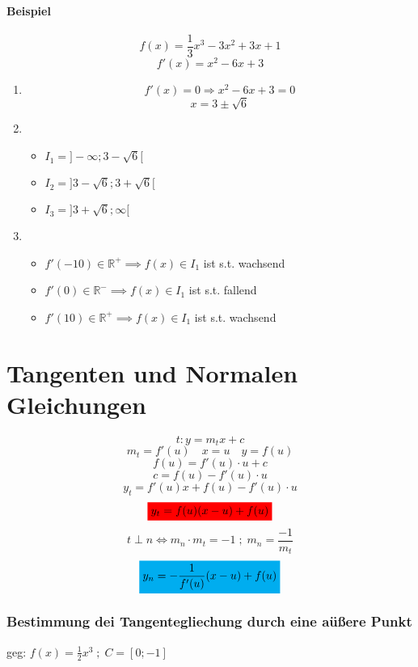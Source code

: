 \documentclass{scrbook}
\newcommand{\mathcolorbox}[2]{\colorbox{#1}{$\displaystyle #2$}}
\begin{document}
\subsubsection{Beispiel}
\[f(x) = \frac 13 x^3 - 3x^2 +3x+1\]
\[f'(x) = x^2 - 6x + 3\]
\begin{enumerate}
\item \[f'(x) = 0 \Rightarrow x^2 - 6x + 3 = 0\]
\[x = 3\pm \sqrt6\]
\item 
\begin{itemize}
\item $I_1 = ]-\infty;3-\sqrt6[ $
\item $I_2 = ]3-\sqrt6; 3+\sqrt6[$
\item $I_3 = ]3+\sqrt6; \infty[$
\end{itemize}
\item 
\begin{itemize}
\item $f'(-10) \in \mathbb{R}^+ \implies f(x) \in I_1$ ist s.t. wachsend
\item $f'(0) \in \mathbb{R}^- \implies f(x) \in I_1$ ist s.t. fallend
\item $f'(10) \in \mathbb{R}^+ \implies f(x) \in I_1$ ist s.t. wachsend
\end{itemize}
\end{enumerate}

\chapter{Tangenten und Normalen Gleichungen}


\[t: y = m_t x + c\]
\[m_t = f'(u) \quad x = u \quad y = f(u)\]
\[f(u) = f'(u) \cdot u+c\]
\[ c = f(u) - f'(u) \cdot u \]
\[y_t = f'(u) x + f(u) - f'(u)\cdot u \]
\[\mathcolorbox {red} {y_t = f(u)(x-u) + f(u)}\]
\[t \perp n \Leftrightarrow m_n \cdot m_t = -1\; ; \; m_n = \frac{-1}{m_t}\]
\[\mathcolorbox {cyan} {y_n = -\frac1{f'(u)}(x-u)+f(u)}\]

\subsection{Bestimmung dei Tangentegliechung durch eine aüßere Punkt}
geg: $f(x) = \frac12 x^3 \; ; \; C = [0; -1]$
\end{document}
